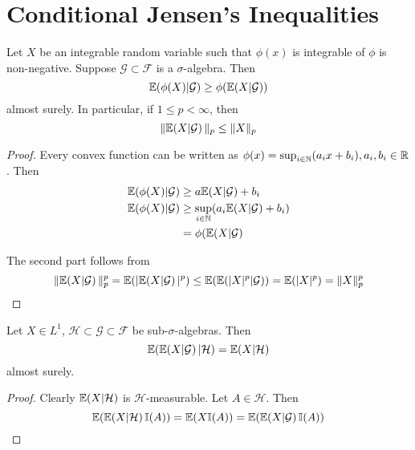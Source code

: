 
\section{Conditional Jensen's Inequalities}
\label{sec:cond-jens-ineq}

Let $X$ be an integrable random variable such that $\phi(x)$ is
integrable of $\phi $ is non-negative. Suppose $\mathcal{G} \subset
\mathcal{F}$ is a $\sigma$-algebra. Then
\begin{equation}
  \label{eq:8}
  \E{\phi(X)|\mathcal{G}} \geq \phi(\E{X|\mathcal{G}})
\end{equation} almost surely.  In particular, if $1 \leq p < \infty$,
then
\begin{equation}
  \label{eq:9}
  \| \E{X | \mathcal{G}} \|_{p} \leq \| X \|_{p}
\end{equation}

\begin{proof}
  Every convex function can be written as $\phi(x) = \sup_{i \in
    \mathbb{N}}(a_{i} x + b_{i}), a_{i}, b_{i} \in \mathbb{R}$.  Then
  \begin{align*}
    \E{\phi(X) | \mathcal{G}} & \geq a \E{X | \mathcal{G}} + b_{i} \\
    \E{\phi(X) | \mathcal{G}} & \geq \sup_{i \in \N} (a_{i} \E{X |
      \mathcal{G}} + b_{i})                                        \\
                              & = \phi(\E{X | \mathcal{G}}
  \end{align*}

  The second part follows from
  \begin{equation}
    \label{eq:10}
    \| \E{X | \mathcal{G}} \|_{p}^{p} = \E{|\E{X | \mathcal{G}}|^{p}}
    \leq \E{\E{|X|^{p} | \mathcal{G}}} = \E{|X|^{p}} = \|X\|_{p}^{p}
  \end{equation}
\end{proof}

\begin{proposition}
  Let $X \in L^{1}$, $\mathcal{H} \subset \mathcal{G} \subset
  \mathcal{F}$ be sub-$\sigma$-algebras.  Then
  \begin{equation}
    \label{eq:11}
    \E{\E{X | \mathcal{G}} | \mathcal{H}} = \E{X | \mathcal{H}}
  \end{equation} almost surely.
\end{proposition}

\begin{proof}
  Clearly $\E{X | \mathcal{H}}$ is $\mathcal{H}$-measurable.  Let $A
  \in \mathcal{H}$.  Then
  \begin{equation}
    \label{eq:12}
    \E{\E{X | \mathcal{H}} \I{A}} = \E{X \I{A}} = \E{\E{X |
        \mathcal{G}} \I{A}}
  \end{equation}
\end{proof}

